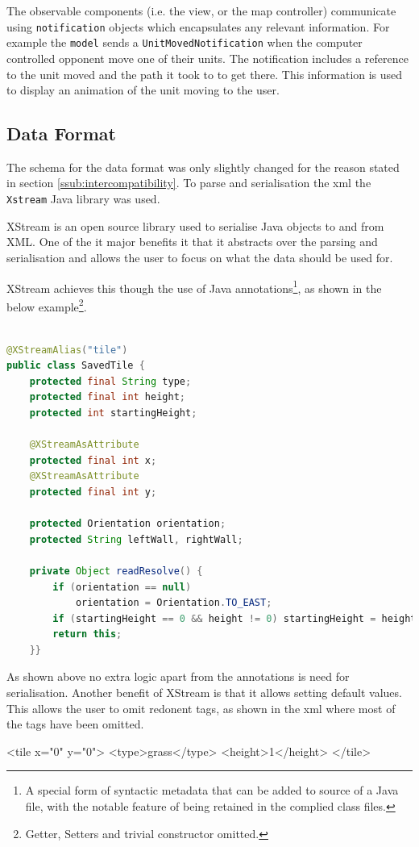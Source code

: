 

The observable components (i.e. the view, or the map controller) communicate using \texttt{notification} objects which encapsulates any relevant information. For example the \texttt{model} sends a \texttt{UnitMovedNotification} when the computer controlled opponent move one of their units. The notification includes a reference to the unit moved and the path it took to to get there. This information is used to display an animation of the unit moving to the user.

\clearpage
\subsection{Data Format}
The schema for the data format was only slightly changed for the reason stated in section \ref{ssub:intercompatibility}. To parse and serialisation the xml  the \texttt{Xstream} Java library was used.

XStream is an open source library used to serialise Java objects to and from XML. One of the it major benefits it that it abstracts over the parsing and serialisation and allows the user to focus on what the data should be used for. 

XStream achieves this though the use of Java annotations\footnote{A special form of syntactic metadata that can be added to source of a Java file, with the notable feature of being retained in the complied class files.	}, as shown in the below example\footnote{Getter, Setters and trivial constructor omitted.}.

\begin{lstlisting}[caption=Example of class that is serialisable with XStream, label=lst:SavedTile, language=java] %Java
	
@XStreamAlias("tile")
public class SavedTile {
	protected final String type;
	protected final int height; 
	protected int startingHeight;
	
	@XStreamAsAttribute
	protected final int x;
	@XStreamAsAttribute
	protected final int y;

	protected Orientation orientation;
	protected String leftWall, rightWall;
	
	private Object readResolve() {
		if (orientation == null)  
			orientation = Orientation.TO_EAST;
		if (startingHeight == 0 && height != 0) startingHeight = height;
		return this;
	}}
\end{lstlisting}
As shown above no extra logic apart from the annotations is need for serialisation.  Another benefit of XStream is that it allows setting default values. This allows the user to omit redonent tags, as shown in the xml where most of the tags have been omitted.
\begin{lst:tile}[caption=Serialised form of the above class. ]
<tile x="0" y="0">
	<type>grass</type>
	<height>1</height>
</tile>
\end{lst:tile}


